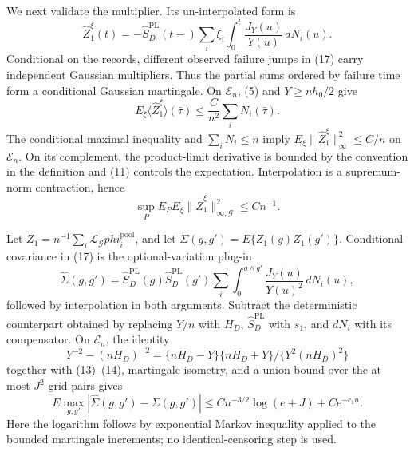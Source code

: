 We next validate the multiplier.  Its un-interpolated form is
\[
 \widehat Z_1^\xi(t)
 =-\widehat S_D^{\mathrm{PL}}(t-)
   \sum_i\xi_i\int_0^t\frac{J_Y(u)}{Y(u)}\,dN_i(u).         \tag{17}
\]
Conditional on the records, different observed failure jumps in (17) carry
independent Gaussian multipliers.  Thus the partial sums ordered by failure
time form a conditional Gaussian martingale.  On \(\mathcal E_n\), (5)
and \(Y\ge nh_0/2\) give
\[
 E_\xi\langle\widehat Z_1^\xi\rangle(\bar\tau)
 \le \frac{C}{n^2}\sum_iN_i(\bar\tau).
\]
The conditional maximal inequality and \(\sum_iN_i\le n\) imply
\(E_\xi\|\widehat Z_1^\xi\|_\infty^2\le C/n\) on
\(\mathcal E_n\).  On its complement, the product-limit derivative is
bounded by the convention in the definition and (11) controls the
expectation.  Interpolation is a supremum-norm contraction, hence
\[
 \sup_PE_PE_\xi\|\widehat Z_1^\xi\|_{\infty,\mathcal G}^2
 \le Cn^{-1}.                                               \tag{18}
\]

Let \(Z_1=n^{-1}\sum_i\mathcal L_{\mathcal G}phi_i^{\mathrm{pool}}\),
and let \(\Sigma(g,g')=E\{Z_1(g)Z_1(g')\}\).  Conditional covariance in
(17) is the optional-variation plug-in
\[
 \widehat\Sigma(g,g')=
 \widehat S_D^{\mathrm{PL}}(g)\widehat S_D^{\mathrm{PL}}(g')
 \sum_i\int_0^{g\wedge g'}\frac{J_Y(u)}{Y(u)^2}\,dN_i(u), \tag{19}
\]
followed by interpolation in both arguments.  Subtract the deterministic
counterpart obtained by replacing \(Y/n\) with \(H_D\),
\(\widehat S_D^{\mathrm{PL}}\) with \(s_1\), and \(dN_i\) with its
compensator.  On \(\mathcal E_n\), the identity
\[
 Y^{-2}-(nH_D)^{-2}
 =\{nH_D-Y\}\{nH_D+Y\}/\{Y^2(nH_D)^2\}                   \tag{20}
\]
together with (13)--(14), martingale isometry, and a union bound over the
at most \(J^2\) grid pairs gives
\[
 E\max_{g,g'}|\widehat\Sigma(g,g')-\Sigma(g,g')|
 \le Cn^{-3/2}\log(e+J)+Ce^{-c_1n}.                       \tag{21}
\]
Here the logarithm follows by exponential Markov inequality applied to the
bounded martingale increments; no identical-censoring step is used.

